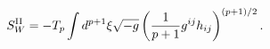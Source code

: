 \begin{equation}
S^{{\rm II}}_{W}=-T_{p}\int d^{p+1}{\xi}\sqrt{-g}\left(\frac{1}{p+1}g^{ij}
h_{ij}\right)^{(p+1)/2}.
\end{equation}

